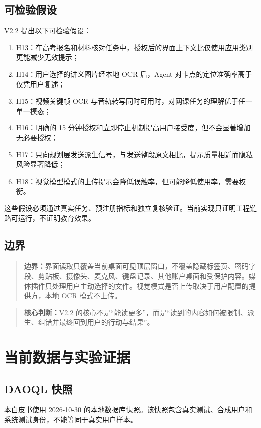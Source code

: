 \documentclass[UTF8,a4paper,11pt]{ctexart}
\newcommand{\keypoint}[1]{\begin{quote}\noindent\textbf{\color{TenderBlue}核心判断：}#1\end{quote}}
\newcommand{\boundary}[1]{\begin{quote}\noindent\textbf{\color{TenderPink}边界：}#1\end{quote}}
\begin{document}
\subsection{可检验假设}

V2.2 提出以下可检验假设：

\begin{enumerate}
\item H13：在高考报名和材料核对任务中，授权后的界面上下文比仅使用应用类别更能减少无效提示；
\item H14：用户选择的讲义图片经本地 OCR 后，Agent 对卡点的定位准确率高于仅凭用户复述；
\item H15：视频关键帧 OCR 与音轨转写同时可用时，对网课任务的理解优于任一单一模态；
\item H16：明确的 15 分钟授权和立即停止机制提高用户接受度，但不会显著增加无必要授权；
\item H17：只向规划层发送派生信号，与发送整段原文相比，提示质量相近而隐私风险显著降低；
\item H18：视觉模型模式的上传提示会降低误触率，但可能降低使用率，需要权衡。
\end{enumerate}

这些假设必须通过真实任务、预注册指标和独立复核验证。当前实现只证明工程链路可运行，不证明教育效果。

\subsection{边界}

\boundary{界面读取只覆盖当前桌面可见顶层窗口，不覆盖隐藏标签页、密码字段、剪贴板、摄像头、麦克风、键盘记录、其他账户桌面和受保护内容。媒体插件只处理用户主动选择的文件。视觉模式是否上传取决于用户配置的提供方，本地 OCR 模式不上传。}

\keypoint{V2.2 的核心不是“能读更多”，而是“读到的内容如何被限制、派生、纠错并最终回到用户的行动与结果”。}

\section{当前数据与实验证据}

\subsection{DAOQL 快照}

本白皮书使用 2026-10-30 的本地数据库快照。该快照包含真实测试、合成用户和系统测试身份，不能等同于真实用户样本。
\end{document}
